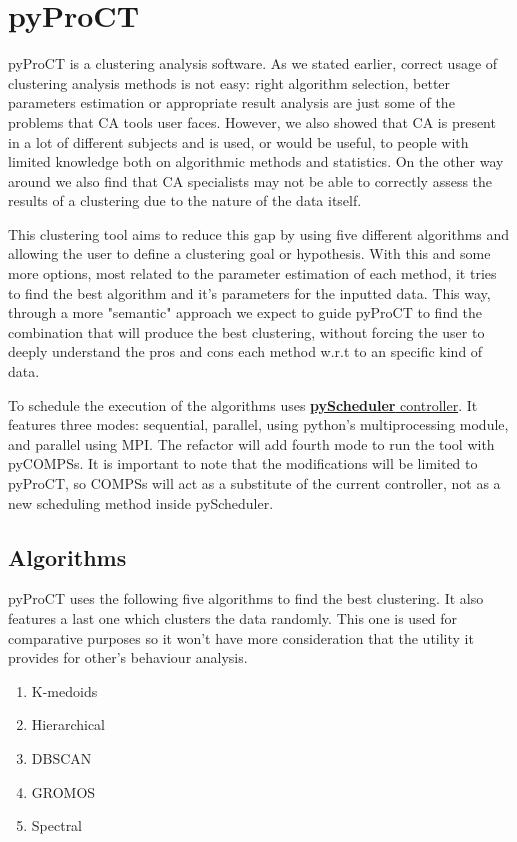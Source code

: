 \chapter{pyProCT}



pyProCT is a clustering analysis software. As we stated earlier, correct usage of clustering analysis methods is not easy: right algorithm selection, better parameters estimation or appropriate result analysis are just some of the problems that CA tools user faces. However, we also showed that CA is present in a lot of different subjects and is used, or would be useful, to people with  limited knowledge both on algorithmic methods and statistics. On the other way around we also find that CA specialists may not be able to correctly assess the results of a clustering due to the nature of the data itself.

This clustering tool aims to reduce this gap by using five different algorithms and allowing the user to define a clustering goal or hypothesis. With this and some more options, most related to the parameter estimation of each method, it tries to find the best algorithm and it's parameters for the inputted data. This way, through a more "semantic" approach we expect to guide pyProCT to find the combination that will produce the best clustering, without forcing the user to deeply understand the pros and cons each method w.r.t to an specific kind of data.

To schedule the execution of the algorithms uses \hyperref[sec:docs]{\textbf{pyScheduler} controller}. It features three modes: sequential, parallel, using python's multiprocessing module, and parallel using MPI. The refactor will add fourth mode to run the tool with pyCOMPSs. It is important to note that the modifications will be limited to pyProCT, so COMPSs will act as a substitute of the current controller, not as a new scheduling method inside pyScheduler.



\section {Algorithms}

pyProCT uses the following five algorithms to find the best clustering. It also features a last one which clusters the data randomly. This one is used for comparative purposes so it won't have more consideration that the utility it provides for other's behaviour analysis.

\begin{enumerate}

\item{K-medoids}
\item{Hierarchical}
\item{DBSCAN}
\item{GROMOS}
\item{Spectral}

\end{enumerate}


